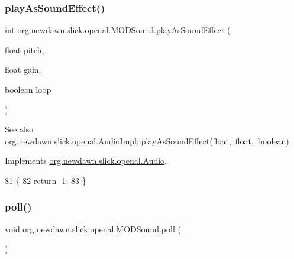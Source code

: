 \subsubsection{\texorpdfstring{play\+As\+Sound\+Effect()}{playAsSoundEffect()}}
{\footnotesize\ttfamily int org.\+newdawn.\+slick.\+openal.\+M\+O\+D\+Sound.\+play\+As\+Sound\+Effect (\begin{DoxyParamCaption}\item[{float}]{pitch,  }\item[{float}]{gain,  }\item[{boolean}]{loop }\end{DoxyParamCaption})\hspace{0.3cm}{\ttfamily [inline]}}

\begin{DoxySeeAlso}{See also}
\mbox{\hyperlink{classorg_1_1newdawn_1_1slick_1_1openal_1_1_audio_impl_a731e0f7331c13b1c6507303ab875c6da}{org.\+newdawn.\+slick.\+openal.\+Audio\+Impl\+::play\+As\+Sound\+Effect(float, float, boolean)}} 
\end{DoxySeeAlso}


Implements \mbox{\hyperlink{interfaceorg_1_1newdawn_1_1slick_1_1openal_1_1_audio_a69c3621a4a4bcbe9f1711f569c54017b}{org.\+newdawn.\+slick.\+openal.\+Audio}}.


\begin{DoxyCode}
81                                                                         \{
82         \textcolor{keywordflow}{return} -1;
83     \}
\end{DoxyCode}
\mbox{\label{classorg_1_1newdawn_1_1slick_1_1openal_1_1_m_o_d_sound_a25a03884f08e6a5a8c711ab7ea339b64}} 
\subsubsection{\texorpdfstring{poll()}{poll()}}
{\footnotesize\ttfamily void org.\+newdawn.\+slick.\+openal.\+M\+O\+D\+Sound.\+poll (\begin{DoxyParamCaption}{ }\end{DoxyParamCaption})\hspace{0.3cm}{\ttfamily [inline]}}

